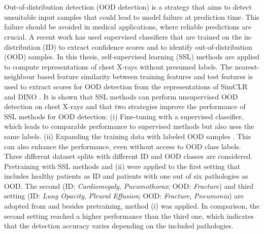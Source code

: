 \section*{}
Out-of-distribution detection (OOD detection) is a strategy that aims to detect unsuitable input samples that could lead to model failure at prediction time.
This failure should be avoided in medical applications, where reliable predictions are crucial.
A recent work \citep{Berger2021} has used supervised classifiers that are trained on the in-distribution (ID) to extract confidence scores and to identify out-of-distribution (OOD) samples.
In this thesis, self-supervised learning (SSL) methods are applied to compute representations of chest X-rays without presumed labels.
The nearest-neighbour based feature similarity between training features and test features \citep{Michels2023,Sun2022} is used to extract scores for OOD detection from the representations of SimCLR \citep{Chen2020} and DINO \citep{Caron2021}.
It is shown that SSL methods can perform unsupervised OOD detection on chest X-rays and that two strategies improve the performance of SSL methods for OOD detection:
(i) Fine-tuning with a supervised classifier, which leads to comparable performance to supervised methods but also uses the same labels.
(ii) Expanding the training data with labeled OOD samples \citep{Fort2021,Hendrycks2018}.
This can also enhance the performance, even without access to OOD class labels.
Three different dataset splits with different ID and OOD classes are considered.
Pretraining with SSL methods and (ii) were applied to the first setting that includes healthy patients as ID and patients with one out of six pathologies as OOD.
The second (ID: \textit{Cardiomegaly}, \textit{Pneumothorax}; OOD: \textit{Fracture}) and third setting (ID: \textit{Lung Opacity}, \textit{Pleural Effusion}; OOD: \textit{Fracture}, \textit{Pneumonia}) are adopted from \citep{Berger2021} and besides pretraining, method (i) was applied.
In comparison, the second setting reached a higher performance than the third one, which indicates that the detection accuracy varies depending on the included pathologies. 